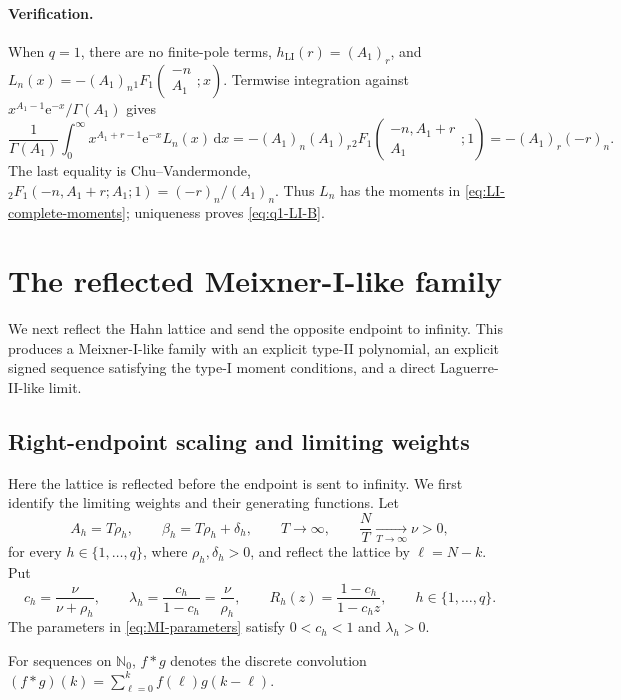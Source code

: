 \documentclass[10pt]{amsart}
\newcommand{\Nzero}{\mathbb N_0}
\newcommand{\e}{\mathrm e}
\newcommand{\dd}{\,\mathrm d}
\newcommand{\pFq}[5]{{}_{#1}F_{#2}\!\left(\begin{matrix}#3\\#4\end{matrix};#5\right)}
\theoremstyle{plain}
\theoremstyle{definition}
\theoremstyle{remark}
\begin{document}
\paragraph{Verification.}
When \(q=1\), there are no finite-pole terms,
\(h_{\mathrm{LI}}(r)=(A_1)_r\), and
\(L_n(x)=-(A_1)_n\pFq{1}{1}{-n}{A_1}{x}\).
Termwise integration against
\(x^{A_1-1}\e^{-x}/\Gamma(A_1)\) gives
\[
 \frac1{\Gamma(A_1)}\int_0^\infty
 x^{A_1+r-1}\e^{-x}L_n(x)\dd x
 =-(A_1)_n(A_1)_r
 \pFq{2}{1}{-n,A_1+r}{A_1}{1}
 =-(A_1)_r(-r)_n.
\]
The last equality is Chu--Vandermonde,
\({}_2F_1(-n,A_1+r;A_1;1)=(-r)_n/(A_1)_n\).
Thus \(L_n\) has the moments in
\eqref{eq:LI-complete-moments}; uniqueness proves
\eqref{eq:q1-LI-B}.


\section{The reflected Meixner-I-like family}
\label{sec:MI}

We next reflect the Hahn lattice and send the opposite endpoint to infinity.
This produces a Meixner-I-like family with an explicit type-II polynomial,
an explicit signed sequence satisfying the type-I moment conditions, and a
direct Laguerre-II-like limit.

\subsection{Right-endpoint scaling and limiting weights}

Here the lattice is reflected before the endpoint is sent to infinity. We
first identify the limiting weights and their generating functions.
Let
\begin{equation}
 A_h=T\rho_h,\qquad
 \beta_h=T\rho_h+\delta_h,\qquad
 T\to\infty,\qquad
 \frac NT\xrightarrow[T\to\infty]{}\nu>0,
 \label{eq:MI-scaling}
\end{equation}
for every \(h\in\{1,\ldots,q\}\), where \(\rho_h,\delta_h>0\), and reflect the lattice by
\(\ell=N-k\). Put
\begin{equation}
 c_h=\frac{\nu}{\nu+\rho_h},
 \qquad
 \lambda_h=\frac{c_h}{1-c_h}=\frac{\nu}{\rho_h},
 \qquad
 R_h(z)=\frac{1-c_h}{1-c_hz},
 \qquad h\in\{1,\ldots,q\}.
 \label{eq:MI-parameters}
\end{equation}
The parameters in \eqref{eq:MI-parameters} satisfy
\(0<c_h<1\) and \(\lambda_h>0\).

For sequences on \(\Nzero\), \(f*g\) denotes the discrete convolution
\((f*g)(k)=\sum_{\ell=0}^kf(\ell)g(k-\ell)\).
\end{document}
